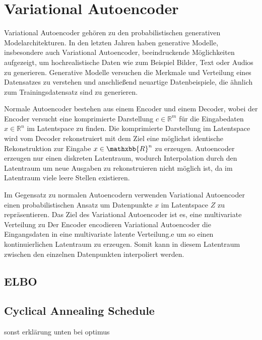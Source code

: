 \section{Variational Autoencoder}\raggedbottom
Variational Autoencoder \citep{kingma2014autoencoding} gehören zu den probabilistischen generativen Modelarchitekturen. In den letzten Jahren haben generative Modelle, insbesondere auch Variational Autoencoder, beeindruckende Möglichkeiten aufgezeigt, um hochrealistische Daten wie zum Beispiel Bilder, Text oder Audios zu generieren.
Generative Modelle versuchen die Merkmale und Verteilung eines Datensatzes zu verstehen und anschließend neuartige Datenbeispiele, die ähnlich zum Trainingsdatensatz sind zu generieren.

Normale Autoencoder bestehen aus einem Encoder und einem Decoder, wobei der Encoder versucht eine komprimierte Darstellung $c\in \mathbb{R}^m$ für die Eingabedaten $x\in \mathbb{R}^n$ im Latentspace zu finden. Die komprimierte Darstellung im Latentspace wird vom Decoder rekonstruiert mit dem Ziel eine möglichst identische Rekonstruktion zur Eingabe $x\in \mathxbb{R}^n$ zu erzeugen.
Autoencoder erzeugen nur einen diskreten Latentraum, wodurch Interpolation durch den Latentraum um neue Ausgaben zu rekonstruieren nicht möglich ist, da im Latentraum viele leere Stellen existieren.

Im Gegensatz zu normalen Autoencodern verwenden Variational Autoencoder einen probabilistischen Ansatz um Datenpunkte $x$ im Latentspace $Z$ zu repräsentieren. Das Ziel des Variational Autoencoder ist es, eine multivariate Verteilung zu Der Encoder encodieren Variational Autoencoder die Eingangsdaten in eine multivariate latente Verteilung.e um so einen kontinuierlichen Latentraum zu erzeugen.
Somit kann in diesem Latentraum zwischen den einzelnen Datenpunkten interpoliert werden.


\subsection{ELBO}


\subsection{Cyclical Annealing Schedule}
\label{cyc_anneal}
sonst erklärung unten bei optimus


